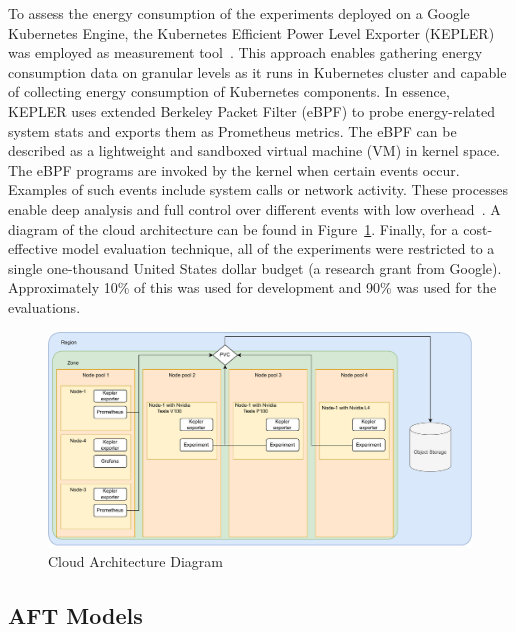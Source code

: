 \documentclass[conference]{IEEEtran}
\begin{document}
{To assess the energy consumption of the experiments deployed on a Google Kubernetes Engine, the Kubernetes Efficient Power Level Exporter (KEPLER) was employed as measurement tool~\cite{amaral2023kepler}. This approach enables gathering energy consumption data on granular levels as it runs in Kubernetes cluster and capable of collecting energy consumption of Kubernetes components. In essence, KEPLER uses extended Berkeley Packet Filter (eBPF) to probe energy-related system stats and exports them as Prometheus metrics. The eBPF can be described as a lightweight and sandboxed virtual machine (VM) in kernel space. The eBPF programs are invoked by the kernel when certain events occur. Examples of such events include system calls or network activity. These processes enable deep analysis and full control over different events with low overhead~\cite{sedghpour@ebpf}. A diagram of the cloud architecture can be found in Figure~\ref{fig:architecture}. Finally, for a cost-effective model evaluation technique, all of the experiments were restricted to a single one-thousand United States dollar budget (a research grant from Google). Approximately 10\% of this was used for development and 90\% was used for the evaluations.

\begin{figure}
    \centering
    \includegraphics[width=.8\textwidth]{plots/architecture.pdf}
    \caption{Cloud Architecture Diagram}
    \label{fig:architecture}
\end{figure}


\subsection{AFT Models}

}
\end{document}
